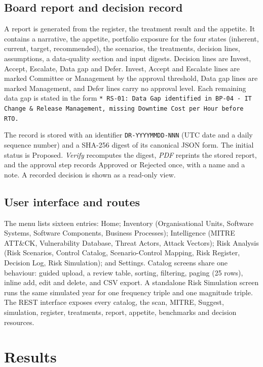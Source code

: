 \documentclass[11pt,a4paper]{article}
\begin{document}
\subsection{Board report and decision record}
A report is generated from the register, the treatment result and the appetite. It contains a narrative, the appetite, portfolio exposure for the four states (inherent, current, target, recommended), the scenarios, the treatments, decision lines, assumptions, a data-quality section and input digests. Decision lines are Invest, Accept, Escalate, Data gap and Defer. Invest, Accept and Escalate lines are marked Committee or Management by the approval threshold, Data gap lines are marked Management, and Defer lines carry no approval level. Each remaining data gap is stated in the form
\texttt{* RS-01: Data Gap identified in BP-04 - IT Change \& Release Management, missing Downtime Cost per Hour before RTO.}

The record is stored with an identifier \texttt{DR-YYYYMMDD-NNN} (UTC date and a daily sequence number) and a SHA-256 digest of its canonical JSON form. The initial status is Proposed. \emph{Verify} recomputes the digest, \emph{PDF} reprints the stored report, and the approval step records Approved or Rejected once, with a name and a note. A recorded decision is shown as a read-only view.

\subsection{User interface and routes}
The menu lists sixteen entries: Home; Inventory (Organisational Units, Software Systems, Software Components, Business Processes); Intelligence (MITRE ATT\&CK, Vulnerability Database, Threat Actors, Attack Vectors); Risk Analysis (Risk Scenarios, Control Catalog, Scenario-Control Mapping, Risk Register, Decision Log, Risk Simulation); and Settings. Catalog screens share one behaviour: guided upload, a review table, sorting, filtering, paging (25 rows), inline add, edit and delete, and CSV export. A standalone Risk Simulation screen runs the same simulated year for one frequency triple and one magnitude triple. The REST interface exposes every catalog, the scan, MITRE, Suggest, simulation, register, treatments, report, appetite, benchmarks and decision resources.

\section{Results}
\end{document}
